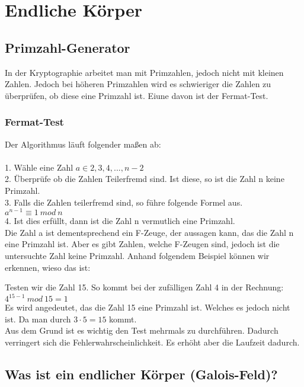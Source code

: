 \chapter{Endliche Körper}

\section{Primzahl-Generator}
In der Kryptographie arbeitet man mit Primzahlen, jedoch nicht mit kleinen Zahlen.
Jedoch bei höheren Primzahlen wird es schwieriger die Zahlen zu überprüfen, ob diese eine Primzahl ist.
Eiune davon ist der Fermat-Test.

\subsection{Fermat-Test}
Der Algorithmus läuft folgender maßen ab:\\
\\
1. Wähle eine Zahl $ a \in {2,3,4,...,n-2}$ \\
2. Überprüfe ob die Zahlen Teilerfremd sind. Ist diese, so ist die Zahl n keine Primzahl.\\
3. Falls die Zahlen teilerfremd sind, so führe folgende Formel aus.\\
$
a^{n-1} \equiv  1\ mod\ n
$\\
4. Ist dies erfüllt, dann ist die Zahl n vermutlich eine Primzahl. 
\\
Die Zahl a ist dementsprechend ein F-Zeuge, der aussagen kann, das die Zahl n eine Primzahl ist.
Aber es gibt Zahlen, welche F-Zeugen sind, jedoch ist die untersuchte Zahl keine Primzahl.
Anhand folgendem Beispiel können wir erkennen, wieso das ist:

Testen wir die Zahl 15. So kommt bei der zufälligen Zahl 4 in der Rechnung: \\
$
4^{15-1}\ mod\ 15 = 1
$\\
Es wird angedeutet, das die Zahl 15 eine Primzahl ist. Welches es jedoch nicht ist. Da man durch $3 \cdot 5 = 15$ kommt.\\
Aus dem Grund ist es wichtig den Test mehrmals zu durchführen. Dadurch verringert sich die Fehlerwahrscheinlichkeit. Es erhöht aber die Laufzeit dadurch.\\

\newpage
\section{Was ist ein endlicher Körper (Galois-Feld)?}

